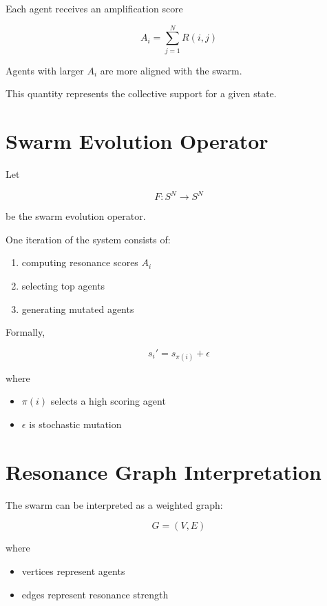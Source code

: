 \documentclass[11pt]{article}
\begin{document}
Each agent receives an amplification score

\[
A_i = \sum_{j=1}^{N} R(i,j)
\]

Agents with larger \(A_i\) are more aligned with the swarm.

This quantity represents the collective support for a given state.

\section{Swarm Evolution Operator}

Let

\[
F : S^N \rightarrow S^N
\]

be the swarm evolution operator.

One iteration of the system consists of:

\begin{enumerate}

\item computing resonance scores \(A_i\)

\item selecting top agents

\item generating mutated agents

\end{enumerate}

Formally,

\[
s_i' = s_{\pi(i)} + \epsilon
\]

where

\begin{itemize}

\item \(\pi(i)\) selects a high scoring agent
\item \(\epsilon\) is stochastic mutation

\end{itemize}

\section{Resonance Graph Interpretation}

The swarm can be interpreted as a weighted graph:

\[
G = (V,E)
\]

where

\begin{itemize}

\item vertices represent agents
\item edges represent resonance strength
\end{itemize}
\end{document}

